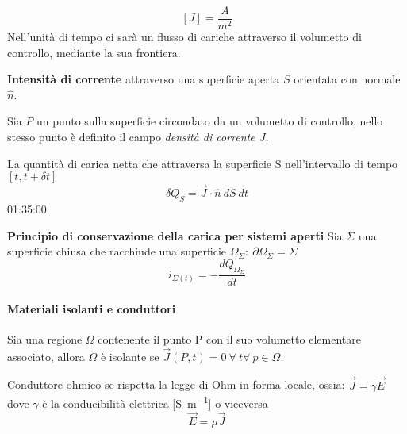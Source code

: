 $$
[J] = \frac{A}{m^2}
$$
Nell'unità di tempo ci sarà un flusso di cariche attraverso il volumetto di controllo, mediante la sua 
frontiera.

\textbf{Intensità di corrente} attraverso una superficie aperta $S$ orientata con normale $\hat{n}$.

Sia $P$ un punto sulla superficie circondato da un volumetto di controllo, nello stesso punto
è definito il campo \textit{densità di corrente $J$}.

La quantità di carica netta che attraversa la superficie S nell'intervallo di tempo $[t,t+\delta t]$
$$
\delta Q_S = \vec{J}\cdot \hat{n}\ dS\ dt
$$
01:35:00



\textbf{Principio di conservazione della carica per sistemi aperti}
Sia $\Sigma$ una superficie chiusa che racchiude una superficie
$\Omega_\Sigma:\ \partial\Omega_\Sigma=\Sigma$
$$
i_{\Sigma(t)} = - \frac{dQ_{\Omega_\Sigma}}{dt}
$$

\paragraph{Materiali isolanti e conduttori}
Sia una regione $\Omega$ contenente il punto P con il suo volumetto elementare associato, allora
$\Omega$ è isolante se $\vec{J}(P,t) = 0\ \forall\ t \forall\ p \in \Omega$.

Conduttore ohmico se rispetta la legge di Ohm in forma locale, ossia:
$\vec{J} = \gamma\vec{E}$ dove $\gamma$ è la conducibilità elettrica [\si{\siemens\per\meter}]
o viceversa
$$
\vec{E} = \mu \vec{J}
$$

